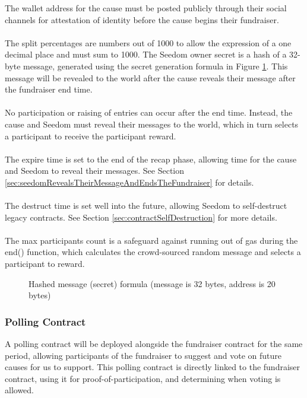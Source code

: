 \documentclass[11pt]{article}
\begin{document}
The wallet address for the cause must be posted publicly through their social channels for attestation of identity before the cause begins their fundraiser.\\\\
The split percentages are numbers out of 1000 to allow the expression of a one decimal place and must sum to 1000. The Seedom owner secret is a hash of a 32-byte message, generated using the secret generation formula in Figure \ref{figure:secretGenerationFormula}. This message will be revealed to the world after the cause reveals their message after the fundraiser end time.\\\\
No participation or raising of entries can occur after the end time. Instead, the cause and Seedom must reveal their messages to the world, which in turn selects a participant to receive the participant reward.\\\\
The expire time is set to the end of the recap phase, allowing time for the cause and Seedom to reveal their messages. See Section \ref{sec:seedomRevealsTheirMessageAndEndsTheFundraiser} for details.\\\\
The destruct time is set well into the future, allowing Seedom to self-destruct legacy contracts. See Section \ref{sec:contractSelfDestruction} for more details.\\\\
The max participants count is a safeguard against running out of gas during the end() function, which calculates the crowd-sourced random message and selects a participant to reward.

\begin{figure}[H]
\begin{center}
\caption{Hashed message (secret) formula (message is 32 bytes, address is 20 bytes)}
\label{figure:secretGenerationFormula}
\end{center}
\end{figure}

\subsubsection{Polling Contract}

A polling contract will be deployed alongside the fundraiser contract for the same period, allowing participants of the fundraiser to suggest and vote on future causes for us to support. This polling contract is directly linked to the fundraiser contract, using it for proof-of-participation, and determining when voting is allowed.
\end{document}
